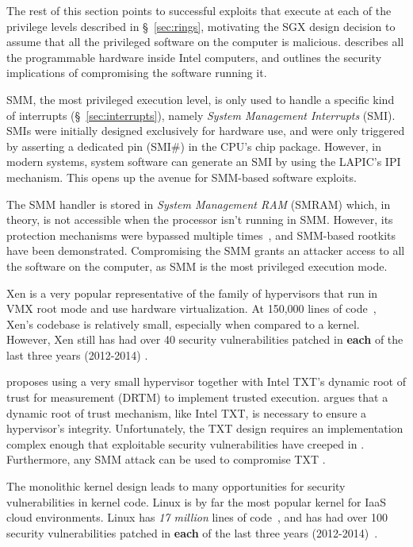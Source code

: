 \label{sec:system_software_attacks}

The rest of this section points to successful exploits that execute at each of
the privilege levels described in \S~\ref{sec:rings}, motivating the SGX design
decision to assume that all the privileged software on the computer is
malicious. \cite{rutkowska2015intelsux} describes all the programmable hardware
inside Intel computers, and outlines the security implications of compromising
the software running it.

SMM, the most privileged execution level, is only used to handle a specific
kind of interrupts (\S~\ref{sec:interrupts}), namely
\textit{System Management Interrupts} (SMI). SMIs were initially designed
exclusively for hardware use, and were only triggered by asserting a dedicated
pin (SMI\#) in the CPU's chip package. However, in modern systems, system
software can generate an SMI by using the LAPIC's IPI mechanism. This opens up
the avenue for SMM-based software exploits.


The SMM handler is stored in  \textit{System Management RAM} (SMRAM) which, in
theory, is not accessible when the processor isn't running in SMM. However, its
protection mechanisms were bypassed multiple times~\cite{duflot2006smm,
rutkowska2008remap, wojtczuk2009smm, kallenberg2014smm}, and SMM-based
rootkits~\cite{wecherowski2009smm, embleton2010smm} have been demonstrated.
Compromising the SMM grants an attacker access to all the software on the
computer, as SMM is the most privileged execution mode.

Xen \cite{zhang2008xen} is a very popular representative of the family of
hypervisors that run in VMX root mode and use hardware virtualization. At
150,000 lines of code~\cite{xen2015loc}, Xen's codebase is relatively small,
especially when compared to a kernel. However, Xen still has had over 40
security vulnerabilities patched in \textbf{each} of the last three years
(2012-2014) \cite{cvedetails2014xen}.

\cite{mccune2010trustvisor} proposes using a very small hypervisor together
with Intel TXT's dynamic root of trust for measurement (DRTM) to implement
trusted execution. \cite{vasudevan2010requirements} argues that a dynamic root
of trust mechanism, like Intel TXT, is necessary to ensure a hypervisor's
integrity.  Unfortunately, the TXT design requires an implementation complex
enough that exploitable security vulnerabilities have creeped in
\cite{wojtczuk2009txt2, wojtczuk2011txt}. Furthermore, any SMM attack can be
used to compromise TXT \cite{wojtczuk2009txt}.

The monolithic kernel design leads to many opportunities for security
vulnerabilities in kernel code. Linux is by far the most popular kernel for
IaaS cloud environments. Linux has \emph{17 million} lines of
code~\cite{anthony2014linuxsize}, and  has had over 100 security
vulnerabilities patched in \textbf{each} of the last three years
(2012-2014)~\cite{cvedetails2014linux, chen2011linux}.
